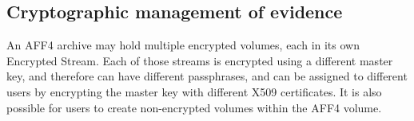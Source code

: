 \documentclass[10pt, conference]{IEEEtran}
\begin{document}






\subsection{Cryptographic management of evidence}
An AFF4 archive may hold multiple encrypted volumes, each in its own
Encrypted Stream. Each of those streams is encrypted using a different
master key, and therefore can have different passphrases, and can be
assigned to different users by encrypting the master key with
different X509 certificates. It is also possible for users to create
non-encrypted volumes within the AFF4 volume.
\end{document}
